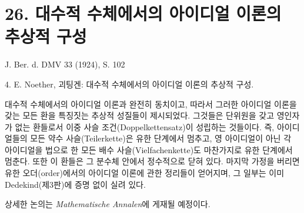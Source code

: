 
\section*{26. 대수적 수체에서의 아이디얼 이론의 추상적 구성}

\begin{center}
J. Ber. d. DMV 33 (1924), S. 102
\end{center}

4. E. Noether, 괴팅겐: 대수적 수체에서의 아이디얼 이론의 추상적 구성.

대수적 수체에서의 아이디얼 이론과 완전히 동치이고, 따라서 그러한 아이디얼 이론을 갖는 모든 환을 특징짓는 추상적 성질들이 제시되었다. 그것들은 단위원을 갖고 영인자가 없는 환들로서 이중 사슬 조건(Doppelkettensatz)이 성립하는 것들이다. 즉, 아이디얼들의 모든 약수 사슬(Teilerkette)은 유한 단계에서 멈추고, 영 아이디얼이 아닌 각 아이디얼을 법으로 한 모든 배수 사슬(Vielfachenkette)도 마찬가지로 유한 단계에서 멈춘다. 또한 이 환들은 그 분수체 안에서 정수적으로 닫혀 있다. 마지막 가정을 버리면 유한 오더(order)에서의 아이디얼 이론에 관한 정리들이 얻어지며, 그 일부는 이미 Dedekind(제3판)에 증명 없이 실려 있다.

상세한 논의는 \emph{Mathematische Annalen}에 게재될 예정이다.
